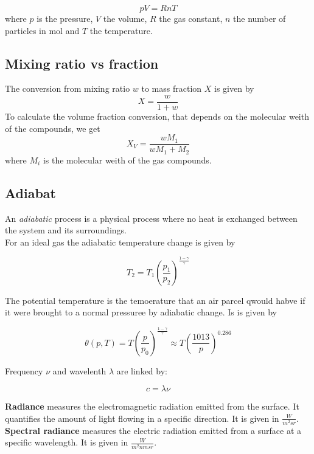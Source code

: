 \documentclass[12pt, a4paper]{article} %
\newcommand{\para}[1]{\left({#1}\right)}
\begin{document}
\begin{equation}
	pV = RnT
\end{equation}
where $p$ is the pressure, $V$ the volume, $R$ the gas constant, $n$ the number of particles in mol and $T$ the temperature.

\subsection{Mixing ratio vs fraction}

The conversion from mixing ratio $w$ to mass fraction $X$ is given by
\begin{equation}
	X = \frac{w}{1+w}
\end{equation}
To calculate the volume fraction conversion, that depends on the molecular weith of the compounds, we get
\begin{equation}
	X_V = \frac{w M_1}{wM_1 + M_2}
\end{equation}
where $M_i$ is the molecular weith of the gas compounds.

\subsection{Adiabat}

An \emph{adiabatic} process is a physical process where no heat is exchanged between the system and its surroundings. \\

For an ideal gas the adiabatic temperature  change is given by

\begin{equation}
	T_2 = T_1 \para{\frac{p_1}{p_2}}^{\frac{1 - \gamma}{\gamma}}
\end{equation}

The potential temperature is the temoerature that an air parcel qwould habve if it were brought to a normal pressuree by adiabatic change. Is is given by

\begin{equation}
	\theta(p, T) = T \para{\frac{p}{p_0}}^{\frac{1 - \gamma}{\gamma}} \approx T \para{\frac{1013}{p}}^{0.286}
\end{equation}

Frequency $\nu$ and wavelenth $\lambda$ are linked by:

\begin{equation}
	c = \lambda \nu
\end{equation}

\textbf{Radiance} measures the electromagnetic radiation emitted from the surface. It quantifies the amount of light flowing in a specific direction. It is given in $\frac{W}{m^2sr}$. \textbf{Spectral radiance} measures the electric radiation emitted from a surface at a specific wavelength. It is given in $\frac{W}{m^2 nm sr}$. \\
\end{document}

